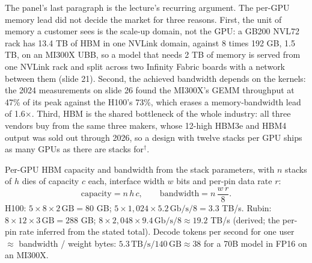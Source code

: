 \documentclass[11pt,letterpaper]{article}
\newenvironment{formulas}{\begin{tcolorbox}[formulabox]}{\end{tcolorbox}}
\begin{document}
The panel's last paragraph is the lecture's recurring argument. The per-GPU memory lead did not decide the market for three reasons. First, the unit of memory a customer sees is the scale-up domain, not the GPU: a GB200 NVL72 rack has 13.4 TB of HBM in one NVLink domain, against 8 times 192 GB, 1.5 TB, on an MI300X UBB, so a model that needs 2 TB of memory is served from one NVLink rack and split across two Infinity Fabric boards with a network between them (slide 21). Second, the achieved bandwidth depends on the kernels: the 2024 measurements on slide 26 found the MI300X's GEMM throughput at 47\% of its peak against the H100's 73\%, which erases a memory-bandwidth lead of 1.6$\times$. Third, HBM is the shared bottleneck of the whole industry: all three vendors buy from the same three makers, whose 12-high HBM3e and HBM4 output was sold out through 2026, so a design with twelve stacks per GPU ships as many GPUs as there are stacks for$^\dagger$.

\begin{formulas}
Per-GPU HBM capacity and bandwidth from the stack parameters, with $n$ stacks of $h$ dies of capacity $c$ each, interface width $w$ bits and per-pin data rate $r$:
\[
\text{capacity} = n\,h\,c,\qquad \text{bandwidth} = n\,\frac{w\,r}{8}.
\]
H100: $5\times 8\times 2\,\text{GB}=80$ GB; $5\times 1{,}024\times 5.2\,\text{Gb/s}/8 = 3.3$ TB/s. Rubin: $8\times 12\times 3\,\text{GB}=288$ GB; $8\times 2{,}048\times 9.4\,\text{Gb/s}/8\approx 19.2$ TB/s (derived; the per-pin rate inferred from the stated total). Decode tokens per second for one user $\approx$ bandwidth / weight bytes: $5.3\,\text{TB/s}/140\,\text{GB}\approx 38$ for a 70B model in FP16 on an MI300X.
\end{formulas}
\end{document}
